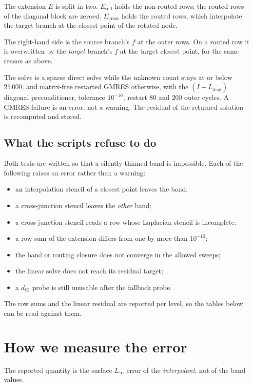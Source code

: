 The extension $E$ is split in two. $E_{\mathrm{self}}$ holds the
non-routed rows; the routed rows of the diagonal block are zeroed.
$E_{\mathrm{cross}}$ holds the routed rows, which interpolate the target
branch at the closest point of the rotated node.

The right-hand side is the source branch's $f$ at the outer rows. On a
routed row it is overwritten by the \emph{target} branch's $f$ at the
target closest point, for the same reason as above.

The solve is a sparse direct solve while the unknown count stays at or
below $25\,000$, and matrix-free restarted GMRES otherwise, with the
$(I-L_{\mathrm{diag}})$ diagonal preconditioner, tolerance $10^{-10}$,
restart 80 and 200 outer cycles. A GMRES failure is an error, not a
warning. The residual of the returned solution is recomputed and stored.

\subsection{What the scripts refuse to do}

Both tests are written so that a silently thinned band is impossible.
Each of the following raises an error rather than a warning:
\begin{itemize}
  \item an interpolation stencil of a closest point leaves the band;
  \item a cross-junction stencil leaves the \emph{other} band;
  \item a cross-junction stencil reads a row whose Laplacian stencil is
        incomplete;
  \item a row sum of the extension differs from one by more than
        $10^{-10}$;
  \item the band or routing closure does not converge in the allowed
        sweeps;
  \item the linear solve does not reach its residual target;
  \item a $d_{k2}$ probe is still unusable after the fallback probe.
\end{itemize}
The row sums and the linear residual are reported per level, so the
tables below can be read against them.

\section{How we measure the error}

The reported quantity is the surface $L_\infty$ error of the
\emph{interpolant}, not of the band values.

